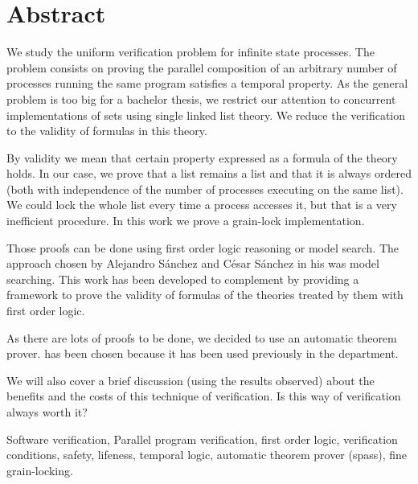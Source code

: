 \chapter*{Abstract}


\begin{abstractEn}

We study the uniform verification problem for infinite state processes. The problem consists on proving the parallel composition of an arbitrary number of processes running the same program satisfies a temporal property.
%
As the general problem is too big for a bachelor thesis, we restrict our attention to concurrent implementations of sets using single linked list theory. 
%
We reduce the verification to the validity of formulas in this theory.

By validity we mean that certain property expressed as a formula of the theory holds.
%
In our case, we prove that a list remains a list and that it is always ordered (both with independence of the number of processes executing on the same list). 
%
We could lock the whole list every time a process accesses it, but that is a very inefficient procedure. 
%
In this work we prove a grain-lock implementation.


Those proofs can be done using first order logic reasoning or model search. 
%
The approach chosen by Alejandro Sánchez and César Sánchez in his  was model searching. 
%
This work has been developed to complement  by providing a framework to prove  the validity of formulas of the theories treated by them with first order logic. 


As there are lots of proofs to be done, we decided to use an automatic theorem prover.  has been chosen because it has been used previously in the department. 


We will also cover a brief discussion (using the results observed) about the benefits and the costs of this technique of verification. Is this way of verification always worth it? 

\end{abstractEn}

\begin{keywordsEn}
Software verification, Parallel program verification, first order logic, verification conditions, safety, lifeness, temporal logic, automatic theorem prover (spass), fine grain-locking.
\end{keywordsEn}

